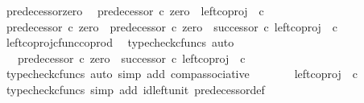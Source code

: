 \begin{isabellebody}
\endisadelimproof
\isanewline
{}\isamarkupfalse%
\ predecessor{\isacharunderscore}{\kern0pt}zero{\isacharcolon}{\kern0pt}\isanewline
\ \ {\isachardoublequoteopen}predecessor\ {\isasymcirc}\isactrlsub c\ zero\ {\isacharequal}{\kern0pt}\ left{\isacharunderscore}{\kern0pt}coproj\ {\isasymone}\ {\isasymnat}\isactrlsub c{\isachardoublequoteclose}\isanewline
%
\isadelimproof
%
\endisadelimproof
%
\isatagproof
{}\isamarkupfalse%
\ {\isacharminus}{\kern0pt}\isanewline
\ \ \isamarkupfalse%
\ {\isachardoublequoteopen}predecessor\ {\isasymcirc}\isactrlsub c\ zero\ {\isacharequal}{\kern0pt}\ predecessor\ {\isasymcirc}\isactrlsub c\ {\isacharparenleft}{\kern0pt}zero\ {\isasymamalg}\ successor{\isacharparenright}{\kern0pt}\ {\isasymcirc}\isactrlsub c\ left{\isacharunderscore}{\kern0pt}coproj\ {\isasymone}\ {\isasymnat}\isactrlsub c{\isachardoublequoteclose}\isanewline
\ \ \ \ \isamarkupfalse%
\ left{\isacharunderscore}{\kern0pt}coproj{\isacharunderscore}{\kern0pt}cfunc{\isacharunderscore}{\kern0pt}coprod\ \isamarkupfalse%
\ {\isacharparenleft}{\kern0pt}typecheck{\isacharunderscore}{\kern0pt}cfuncs{\isacharcomma}{\kern0pt}\ auto{\isacharparenright}{\kern0pt}\isanewline
\ \ \isamarkupfalse%
\ \isamarkupfalse%
\ {\isachardoublequoteopen}{\isachardot}{\kern0pt}{\isachardot}{\kern0pt}{\isachardot}{\kern0pt}\ {\isacharequal}{\kern0pt}\ {\isacharparenleft}{\kern0pt}predecessor\ {\isasymcirc}\isactrlsub c\ {\isacharparenleft}{\kern0pt}zero\ {\isasymamalg}\ successor{\isacharparenright}{\kern0pt}{\isacharparenright}{\kern0pt}\ {\isasymcirc}\isactrlsub c\ left{\isacharunderscore}{\kern0pt}coproj\ {\isasymone}\ {\isasymnat}\isactrlsub c{\isachardoublequoteclose}\isanewline
\ \ \ \ \isamarkupfalse%
\ {\isacharparenleft}{\kern0pt}typecheck{\isacharunderscore}{\kern0pt}cfuncs{\isacharcomma}{\kern0pt}\ auto\ simp\ add{\isacharcolon}{\kern0pt}\ comp{\isacharunderscore}{\kern0pt}associative{}{\isacharparenright}{\kern0pt}\isanewline
\ \ \isamarkupfalse%
\ \isamarkupfalse%
\ {\isachardoublequoteopen}{\isachardot}{\kern0pt}{\isachardot}{\kern0pt}{\isachardot}{\kern0pt}\ {\isacharequal}{\kern0pt}\ left{\isacharunderscore}{\kern0pt}coproj\ {\isasymone}\ {\isasymnat}\isactrlsub c{\isachardoublequoteclose}\isanewline
\ \ \ \ \isamarkupfalse%
\ {\isacharparenleft}{\kern0pt}typecheck{\isacharunderscore}{\kern0pt}cfuncs{\isacharcomma}{\kern0pt}\ simp\ add{\isacharcolon}{\kern0pt}\ id{\isacharunderscore}{\kern0pt}left{\isacharunderscore}{\kern0pt}unit{}\ predecessor{\isacharunderscore}{\kern0pt}def{}{\isacharparenright}{\kern0pt}\isanewline

\end{isabellebody}
